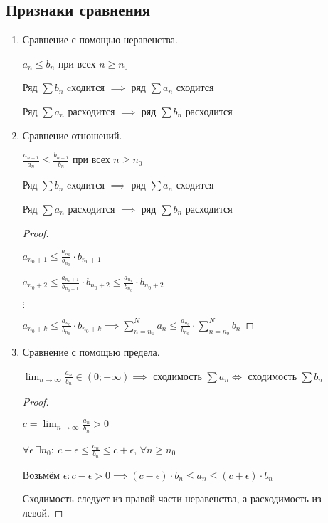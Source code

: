 \subsection{Признаки сравнения}
	\begin{enumerate}
	\item Сравнение с помощью неравенства.
	
	$a_n \leqslant b_n$ при всех $n \geqslant n_0$
	
	Ряд $\sum b_n$ cходится $\implies$ ряд $\sum a_n$ сходится
	
	Ряд $\sum a_n$ расходится $\implies$ ряд $\sum b_n$ расходится
	
	
	\item Сравнение отношений.
	
	$\frac{a_{n+1}}{a_n} \leqslant \frac{b_{n+1}}{b_n}$ при всех $n \geqslant n_0$
	
	Ряд $\sum b_n$ cходится $\implies$ ряд $\sum a_n$ сходится
	
	Ряд $\sum a_n$ расходится $\implies$ ряд $\sum b_n$ расходится
	
	\begin{proof}~
	
	$a_{n_0+1} \leqslant \frac{a_{n_0}}{b_{n_0}}\cdot b_{n_0 + 1}$
	
	$a_{n_0+2} \leqslant \frac{a_{n_0 + 1}}{b_{n_0 + 1}}\cdot b_{n_0 + 2} \leqslant \frac{a_{n_0}}{b_{n_0}}\cdot b_{n_0 + 2}$
	
	$\vdots$
	
	$a_{n_0+k} \leqslant \frac{a_{n_0}}{b_{n_0}}\cdot b_{n_0 + k} \implies \sum_{n=n_0}^{N} a_n \leqslant \frac{a_{n_0}}{b_{n_0}}\cdot \sum_{n=n_0}^{N} b_n$
	\end{proof}

	\item Сравнение с помощью предела.
	
	$\lim_{n \to \infty} \frac{a_n}{b_n} \in (0; +\infty) \implies$ сходимость $\sum a_n \iff$ сходимость $\sum b_n$
	
	\begin{proof}~
		
	$c = \lim_{n \to \infty} \frac{a_n}{b_n} > 0$
	
	$\forall \epsilon\ \exists n_0:\ c - \epsilon \leqslant \frac{a_n}{b_n} \leqslant c + \epsilon$, $\forall n \geqslant n_0$
	
	Возьмём $\epsilon : c - \epsilon > 0 \implies (c - \epsilon)\cdot b_n \leqslant a_n \leqslant (c + \epsilon)\cdot b_n$
	
	Сходимость следует из правой части неравенства, а расходимость из левой. 
	\end{proof}
\end{enumerate}

